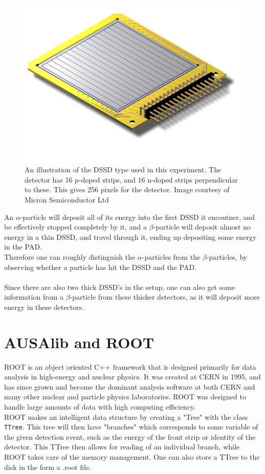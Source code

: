 \begin{figure}[h]
	\centering
	\includegraphics[width=\columnwidth]{../figures/W1.jpg}
	\caption{An illustration of the DSSD type used in this experiment. The detector has 16 p-doped strips, and 16 n-doped strips perpendicular to these. This gives 256 pixels for the detector. Image courtesy of Micron Semiconductor Ltd}
	\label{fig:W1}
\end{figure}

An $\alpha$-particle will deposit all of its energy into the first DSSD it encoutner, and be effectively stopped completely by it, and a $\beta$-particle will deposit almost no energy in a thin DSSD, and travel through it, ending up depositing some energy in the PAD. \\
Therefore one can roughly distinguish the $\alpha$-particles from the $\beta$-particles, by observing whether a particle has hit the DSSD and the PAD. \\
\\
Since there are also two thick DSSD's in the setup, one can also get some information from a $\beta$-particle from these thicker detectors, as it will deposit more energy in these detectors. 




\section{AUSAlib and ROOT}
ROOT \cite{ROOT} is an object oriented C++ framework that is designed primarily for data analysis in high-energy and nuclear physics. It was created at CERN in 1995, and has since grown and become the dominant analysis software at both CERN and many other nuclear and particle physics laboratories. 
ROOT was designed to handle large amounts of data with high computing efficiency. \\
ROOT makes an intelligent data structure by creating a "Tree" with the class \texttt{TTree}. This tree will then have "branches" which corresponds to some variable of the given detection event, such as the energy of the front strip or identity of the detector. This TTree  then allows for reading of an individual branch, while ROOT takes care of the memory management. One can also store a TTree to the disk in the form a .root file. \\

